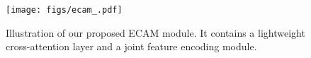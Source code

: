 \begin{figure}
\centering
\texttt{[image: figs/ecam\_.pdf]}
\caption{Illustration of our proposed ECAM module. It contains a lightweight cross-attention layer and a joint feature encoding module.}
\label{fig:ecam}
\end{figure}

